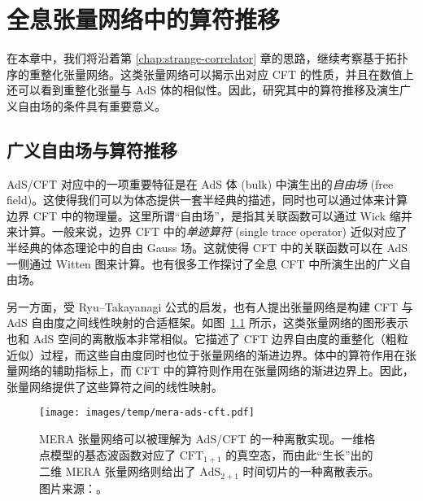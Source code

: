 \chapter{全息张量网络中的算符推移}
\label{chap:operator-pushing}

\renewcommand{\arraystretch}{0.8}

在本章中，我们将沿着第 \ref{chap:strange-correlator} 章的思路，继续考察基于拓扑序的重整化张量网络。这类张量网络可以揭示出对应 CFT 的性质，并且在数值上还可以看到重整化张量与 AdS 体的相似性。因此，研究其中的算符推移及演生广义自由场的条件具有重要意义。

\section{广义自由场与算符推移}

AdS/CFT 对应\cite{maldacena1999large}中的一项重要特征是在 AdS 体 (bulk) 中演生出的\emph{自由场} (free field)。这使得我们可以为体态提供一套半经典的描述，同时也可以通过体来计算边界 CFT 中的物理量。这里所谓“自由场”，是指其关联函数可以通过 Wick 缩并来计算。一般来说，边界 CFT 中的\emph{单迹算符} (single trace operator) 近似对应了半经典的体态理论中的自由 Gauss 场。这就使得 CFT 中的关联函数可以在 AdS 一侧通过 Witten 图来计算\cite{witten1998anti,gubser1998gauge}。也有很多工作探讨了全息 CFT 中所演生出的广义自由场\cite{dutsch2003generalized,liu2019dimensional,collier2019quantum,nebabu2023bulk}。

另一方面，受 Ryu--Takayanagi 公式\cite{ryu2006holographic}的启发，也有人提出张量网络是构建 CFT 与 AdS 自由度之间线性映射的合适框架\cite{swingle2012entanglement}。如图~\ref{fig:mera-ads-cft} 所示，这类张量网络的图形表示也和 AdS 空间的离散版本非常相似。它描述了 CFT 边界自由度的重整化（粗粒近似）过程，而这些自由度同时也位于张量网络的渐进边界。体中的算符作用在张量网络的辅助指标上，而 CFT 中的算符则作用在张量网络的渐进边界上。因此，张量网络提供了这些算符之间的线性映射\cite{pastawski2015holographic,hayden2016holographic}。

\begin{figure}[htb]
  \centering
  \texttt{[image: images/temp/mera-ads-cft.pdf]}
  \caption[MERA 张量网络与 AdS/CFT]{MERA 张量网络可以被理解为 AdS/CFT 的一种离散实现。一维格点模型的基态波函数对应了 $\text{CFT}_{1+1}$ 的真空态，而由此“生长”出的二维 MERA 张量网络则给出了 $\text{AdS}_{2+1}$ 时间切片的一种离散表示。图片来源：\parencite{evenbly2011tensor}。}
  \label{fig:mera-ads-cft}
\end{figure}

